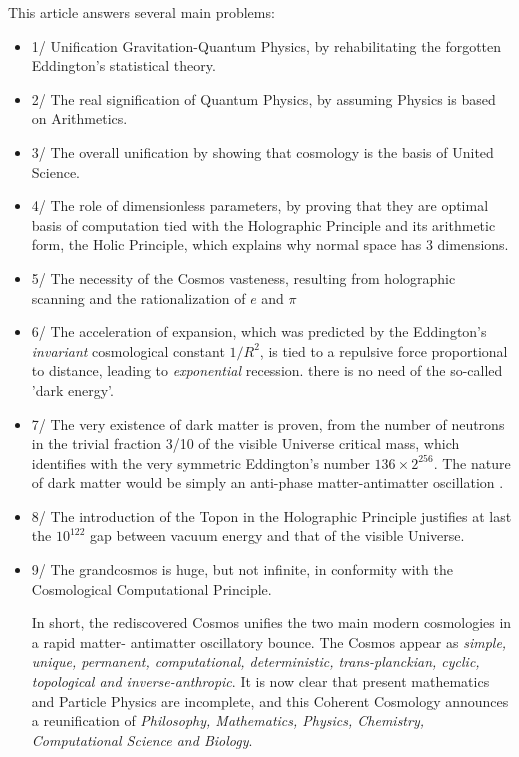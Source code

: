 \documentclass[twoside,draft]{article}
\begin{document}
\begin{sloppypar}
This article answers several main problems: 
\begin{itemize}
\item 1/ Unification Gravitation-Quantum Physics, by
rehabilitating the forgotten Eddington's statistical theory. 
\item 2/ The real signification of Quantum
Physics, by assuming Physics is based on Arithmetics. 
\item 3/ The overall unification by showing that
cosmology is the basis of United Science. 
\item 4/ The role of dimensionless parameters, by proving that
they are optimal basis of computation tied with the Holographic Principle and its arithmetic form,
the Holic Principle, which explains why normal space has 3 dimensions.
\item 5/ The necessity of the Cosmos vasteness, resulting from holographic scanning and the rationalization of $e$ and $\pi$
\item 6/ The acceleration of expansion, which was predicted by the Eddington's \textit{invariant} cosmological constant $1/R^2$, is tied to a repulsive force proportional to distance, leading to \textit{exponential} recession. there is no need of the so-called 'dark energy'.
\item 7/ The very existence of dark matter is proven, from the number of neutrons in the trivial fraction 3/10 of the visible Universe critical mass, which identifies with the very symmetric Eddington's number $136 \times 2^{256}$. The nature of dark matter would be simply an anti-phase matter-antimatter oscillation \cite{Sanchez1}.  
\item 8/ The introduction of the Topon in the Holographic Principle justifies at last the $10^{122}$ gap between vacuum energy and that of the visible Universe.
\item 9/ The grandcosmos is huge, but not infinite, in conformity with the Cosmological Computational Principle.

In short, the rediscovered Cosmos unifies the two main modern cosmologies in a rapid matter-
antimatter oscillatory bounce. The Cosmos appear as \textit{simple, unique, permanent, computational,
deterministic, trans-planckian, cyclic, topological and inverse-anthropic}. It is now clear that present mathematics and Particle Physics are incomplete, and this Coherent Cosmology announces a reunification of \textit{Philosophy, Mathematics, Physics, Chemistry, Computational Science and Biology}.




\end{itemize}
\end{sloppypar}
\end{document}
